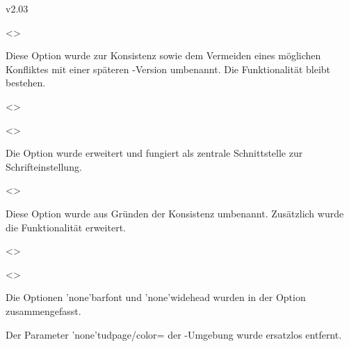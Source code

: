 \begin{Cessations}{v2.03}
\begin{Cessation}
  {}
  <>
\printdeclarationlist

Diese Option wurde zur Konsistenz sowie dem Vermeiden eines möglichen 
Konfliktes mit einer späteren \KOMAScript-Version umbenannt. Die Funktionalität 
bleibt bestehen.
\end{Cessation}

\begin{Cessation}
  {}
  <>
\begin{Cessation}
  {}
  <>
\printdeclarationlist

Die Option  wurde erweitert und fungiert als zentrale 
Schnittstelle zur Schrifteinstellung. 
\end{Cessation}
\end{Cessation}

\begin{Cessation}
  {}
  <>
\printdeclarationlist

Diese Option wurde aus Gründen der Konsistenz umbenannt. Zusätzlich wurde die 
Funktionalität erweitert.
\end{Cessation}

\begin{Cessation}
  {}
  <>
\begin{Cessation}
  {}
  <>
\printdeclarationlist

Die Optionen \Option*'none'{barfont} und \Option*'none'{widehead} wurden in der 
Option  zusammengefasst.
\end{Cessation}
\end{Cessation}

\begin{Declaration*}
  {}
\begin{Cessation}
  {}
\printdeclarationlist

Der Parameter \Environment*'none'{tudpage/color=} der 
-Umgebung wurde ersatzlos entfernt.
\end{Cessation}
\end{Declaration*}
\end{Cessations}



